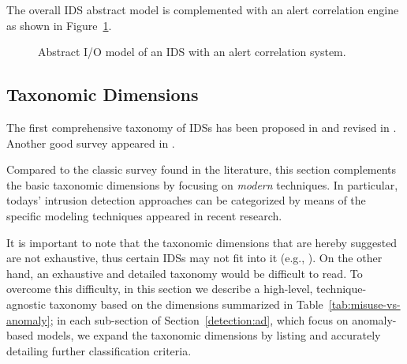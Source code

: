 \noindent The overall \ac{IDS} abstract model is complemented with an
alert correlation engine as shown in
Figure~\ref{fig:ids-ac-abstract-model}.

\begin{figure}[t]
  \centering
  \caption{Abstract I/O model of an \ac{IDS} with an alert correlation
  system.}
  \label{fig:ids-ac-abstract-model}
\end{figure}

\subsection{Taxonomic Dimensions}
\label{detection:id:taxonomy}
The first comprehensive taxonomy of \acp{IDS} has been
proposed in \citep{debar1999towards} and revised in
\citep{debar2000revised}. Another good survey appeared in
\citep{axelsson-intrusion}.

Compared to the classic survey found in the literature, this section
complements the basic taxonomic dimensions by focusing on
\emph{modern} techniques. In particular, todays' intrusion detection
approaches can be categorized by means of the specific modeling
techniques appeared in recent research.

It is important to note that the taxonomic dimensions that are
hereby suggested are not exhaustive, thus certain \acp{IDS} may not
fit into it (e.g.,
\citep{vigilante,argos:eurosys06,newsome2005dynamic}). On the other
hand, an exhaustive and detailed taxonomy would be difficult to
read. To overcome this difficulty, in this section we describe a
high-level, technique-agnostic taxonomy based on the dimensions
summarized in Table~\ref{tab:misuse-vs-anomaly}; in each sub-section
of Section~\ref{detection:ad}, which focus on anomaly-based models, we
expand the taxonomic dimensions by listing and accurately detailing
further classification criteria.

